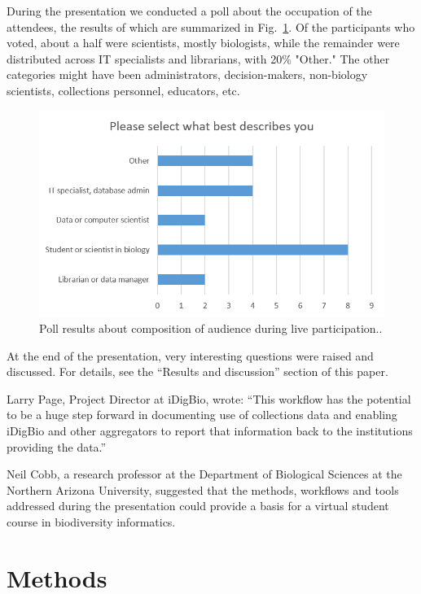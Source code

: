 During the presentation we conducted a poll about the occupation of the attendees, the results of which are summarized in Fig.~\ref{fig:webinar-poll}. Of the participants who voted, about a half were scientists, mostly biologists, while the remainder were distributed across IT specialists and librarians, with 20\% "Other." The other categories might have been administrators, decision-makers, non-biology scientists, collections personnel, educators, etc.

\begin{figure}
\centering
\includegraphics[width=\textwidth]{Figures/webinar-pool}
\decoRule
\caption{Poll results about composition of audience during live participation..}
\label{fig:webinar-poll}
\end{figure}

At the end of the presentation, very interesting questions were raised and discussed. For details, see the ``Results and discussion'' section of this paper.

Larry Page, Project Director at iDigBio, wrote: ``This workflow has the potential to be a huge step forward in documenting use of collections data and enabling iDigBio and other aggregators to report that information back to the institutions providing the data.''

Neil Cobb, a research professor at the Department of Biological Sciences at the Northern Arizona University, suggested that the methods, workflows and tools addressed during the presentation could provide a basis for a virtual student course in biodiversity informatics.

\section{Methods}

